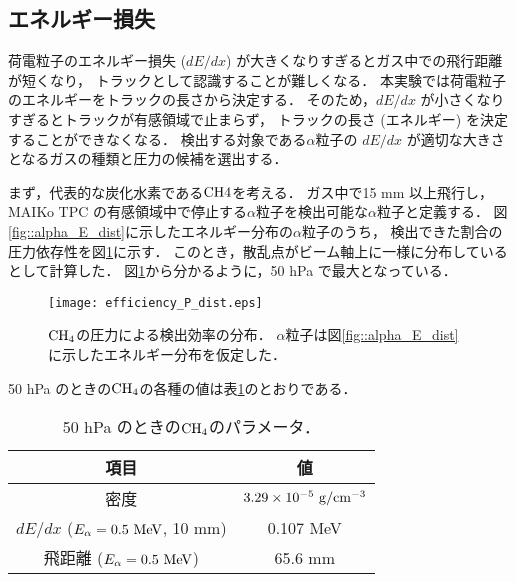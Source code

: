 \documentclass[../master]{subfiles}
\begin{document}
\subsection{エネルギー損失}
荷電粒子のエネルギー損失 ($dE/dx$) が大きくなりすぎるとガス中での飛行距離が短くなり，
トラックとして認識することが難しくなる．
本実験では荷電粒子のエネルギーをトラックの長さから決定する．
そのため，$dE/dx$ が小さくなりすぎるとトラックが有感領域で止まらず，
トラックの長さ (エネルギー) を決定することができなくなる．
検出する対象である$\alpha$粒子の $dE/dx$ が適切な大きさとなるガスの種類と圧力の候補を選出する．

まず，代表的な炭化水素である${\rm CH{4}}$を考える．
ガス中で15 mm 以上飛行し，MAIKo TPC の有感領域中で停止する$\alpha$粒子を検出可能な$\alpha$粒子と定義する．
図\ref{fig::alpha_E_dist}に示したエネルギー分布の$\alpha$粒子のうち，
検出できた割合の圧力依存性を図\ref{fig::efficiency_P_dist}に示す．
このとき，散乱点がビーム軸上に一様に分布しているとして計算した．
図\ref{fig::efficiency_P_dist}から分かるように，50 hPa で最大となっている．
\begin{figure}
  \centering
  \texttt{[image: efficiency\_P\_dist.eps]}
  \caption[${\rm CH_{4}}$の圧力による検出効率の分布．]
          {${\rm CH_{4}}$の圧力による検出効率の分布．
            $\alpha$粒子は図\ref{fig::alpha_E_dist}に示したエネルギー分布を仮定した．
           }
  \label{fig::efficiency_P_dist}
\end{figure}
50 hPa のときの${\rm CH_{4}}$の各種の値は表\ref{tab::CH4_50_params}のとおりである．
\begin{table}
  \centering
  \caption{50 hPa のときの${\rm CH_{4}}$のパラメータ．}
  \label{tab::CH4_50_params}
  \begin{tabular}{cc}
    \toprule
    項目 & 値\\
    \midrule
    密度 & $3.29\times10^{-5}~{\rm g/cm^{-3}}$\\
    $dE/dx$ ($E_{\alpha} = 0.5~{\rm MeV}$, 10 mm) & 0.107 MeV\\
    飛距離 ($E_{\alpha} = 0.5~{\rm MeV}$) & 65.6 mm \\
    \bottomrule
  \end{tabular}
\end{table}
\end{document}
